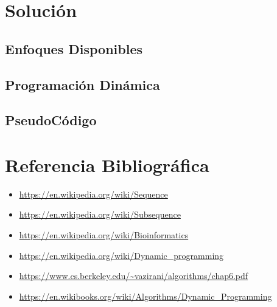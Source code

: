 \documentclass{article}
\begin{document}
\section{Solución}
	\subsection{Enfoques Disponibles}

	\subsection{Programación Dinámica}

	\subsection{PseudoCódigo}

\section{Referencia Bibliográfica}

	\begin{itemize}
		\item \url{https://en.wikipedia.org/wiki/Sequence}	
		\item \url{https://en.wikipedia.org/wiki/Subsequence}	
		\item \url{https://en.wikipedia.org/wiki/Bioinformatics}	
		\item \url{https://en.wikipedia.org/wiki/Dynamic_programming}	
		\item \url{https://www.cs.berkeley.edu/~vazirani/algorithms/chap6.pdf}	
		\item \url{https://en.wikibooks.org/wiki/Algorithms/Dynamic_Programming}	
		
		
		
	\end{itemize}
\end{document}
